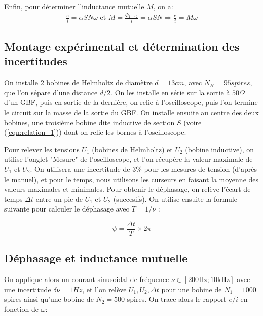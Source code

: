 \documentclass[11pt]{article}
\begin{document}
Enfin, pour déterminer l'inductance mutuelle $M$, on a:
\begin{align}
  \label{eqn:relation_M}
  \frac{e}{i} = \alpha S N \omega \text{ et } M = \frac{\Phi_{1 \rightarrow 2}}{ i} = \alpha S N \Rightarrow \frac{e}{i} = M \omega
\end{align}

\subsection{Montage expérimental et détermination des incertitudes}
On installe 2 bobines de Helmholtz de diamètre $d = 13cm$, avec $N_H = 95 spires$, que l'on sépare d'une distance $d/2$. On les installe en série sur la sortie
à $50\Omega$ d'un GBF, puis en sortie de la dernière, on relie à l'oscilloscope, puis l'on termine le circuit sur la masse de la sortie du GBF. 
On installe ensuite au centre des deux bobines, une troisième bobine dite inductive de section $S$ (voire (\ref{eqn:relation_1})) dont on relie les bornes à l'oscilloscope.

Pour relever les tensions $U_1$ (bobines de Helmholtz) et $U_2$ (bobine inductive), on utilise l'onglet "Mesure" de l'oscilloscope, et l'on récupère la valeur maximale
de $U_1$ et $U_2$. On utilisera une incertitude de $3\%$ pour les mesures de tension (d'après le manuel), et pour le temps, nous utilisons les curseurs en faisant la moyenne des valeurs maximales
et minimales. Pour obtenir le déphasage, on relève l'écart de temps $\Delta t$ entre un pic de $U_1$ et $U_2$ (succesifs). On utilise ensuite la formule suivante pour calculer le déphasage avec $T = 1/\nu$ :

\begin{equation}
    \psi = \frac{\Delta t}{T} \times 2\pi
\end{equation}

\subsection{Déphasage et inductance mutuelle}
On applique alors un courant sinusoidal de fréquence $\nu \in [200\text{Hz}; 10\text{kHz}]$ avec une incertitude $\delta \nu = 1Hz$, et l'on relève $U_1, U_2, \Delta t$ pour une bobine de $N_1 = 1000$ spires ainsi qu'une bobine de $N_2 = 500$ spires. 
On trace alors le rapport $e/i$ en fonction de $\omega$:
\end{document}
